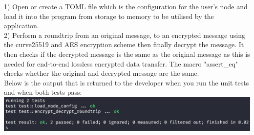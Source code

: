 \documentclass[a4paper, titlepage]{article}
\begin{document}
1) Open or create a TOML file which is the configuration for the user's node and load it into the program from storage to memory to be utilised by the application. \\

2) Perform a roundtrip from an original message, to an encrypted message using the curve25519 and AES encryption scheme then finally decrypt the message. It then checks if the decrypted message is the same as the original message as this is needed for end-to-end lossless encrypted data transfer. The macro "assert\_eq" checks whether the original and decrypted message are the same.\\

Below is the output that is returned to the developer when you run the unit tests and when both tests pass: \\

\includegraphics[width=1\textwidth]{tests_running.png}\par
\end{document}

